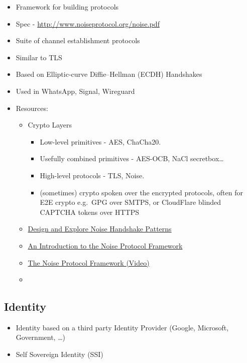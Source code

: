 \begin{itemize}
\tightlist
\item
  Framework for building protocols
\item
  Spec - \url{http://www.noiseprotocol.org/noise.pdf}
\item
  Suite of channel establishment protocols
\item
  Similar to TLS
\item
  Based on Elliptic-curve Diffie--Hellman (ECDH) Handshakes
\item
  Used in WhatsApp, Signal, Wireguard
\item
  Resources:

  \begin{itemize}
  \tightlist
  \item
    Crypto Layers

    \begin{itemize}
    \tightlist
    \item
      Low-level primitives - AES, ChaCha20.
    \item
      Usefully combined primitives - AES-OCB, NaCl secretbox\ldots{}
    \item
      High-level protocols - TLS, Noise.
    \item
      (sometimes) crypto spoken over the encrypted protocols, often for
      E2E crypto e.g.~GPG over SMTPS, or CloudFlare blinded CAPTCHA
      tokens over HTTPS
    \end{itemize}
  \item
    \href{https://noiseexplorer.com/}{Design and Explore Noise Handshake
    Patterns}
  \item
    \href{https://duo.com/labs/tech-notes/noise-protocol-framework-intro}{An
    Introduction to the Noise Protocol Framework}
  \item
    \href{https://www.youtube.com/watch?v=ceGTgqypwnQ}{The Noise
    Protocol Framework (Video)}
  \item
  \end{itemize}
\end{itemize}

\hypertarget{identity}{%
\subsection{Identity}\label{identity}}

\begin{itemize}
\tightlist
\item
  Identity based on a third party Identity Provider (Google, Microsoft,
  Government, \ldots)
\item
  Self Sovereign Identity (SSI)
\end{itemize}

